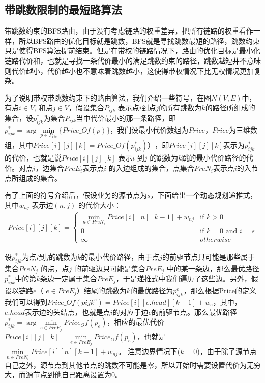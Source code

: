 \subsection{带跳数限制的最短路算法}
带跳数约束的BFS路由，由于没有考虑链路的权重差异，把所有链路的权重看作一样，所以BFS路由的优化目标就是跳数，BFS就是寻找跳数最短的路径，跳数约束只是使得BFS算法提前结束。但是在带权的链路情况下，路由的优化目标是最小化链路代价和，也就是寻找一条代价最小的满足跳数约束的路径，跳数越短并不意味则代价越小，代价越小也不意味着跳数越小，这使得带权情况下比无权情况更加复杂。

为了说明带权带跳数约束下的路由算法，我们介绍一些符号，在图$N(V,E)$中，有点$i \in V$, 和点$j \in V$，假设集合$P_{ijk}$ 表示点$i$到点$j$的所有跳数为$k$的路径所组成的集合，设$p_{ijk}^*$为集合$P_{ijk}$当中代价最小的那一条路径，即$p_{ijk}^* =\arg\min\limits_{p \in P_{ijk}}\{Price\_Of(p)\}$，我们设最小代价数组为$Price$，$Price$为三维数组，其中$Price[i][j][k]=Price\_Of(p_{ijk}^*) ）$，即$Price[i][j][k]$表示为$p_{ijk}^*$ 的代价，也就是说$Price[i][j][k]$ 表示$i$ 到$j$ 的跳数为$k$跳的最小代价路径的代价。对点$i$，边集合$PreE_i$表示点$i$ 的入边组成的集合，点集合$PreN_i$表示点$i$的入节点所组成的集合。

有了上面的符号介绍后，假设业务的源节点为$s$，下面给出一个动态规划递推式，其中$w_{nj}$ 表示边$(n,j)$ 的代价大小：
\begin{equation}\label{dynamic}
\begin{split}
Price[i][j][k]
=\begin{cases}
\min\limits_{n \in PreN_i}{Price[i][n][k-1]+w_{nj}} & \text{if $k>0$}\\
0 & \text{if $k=0$ and $i=s $} \\
\infty &{otherwise}
\end{cases}
\end{split}
\end{equation}

设$p_{ijk}^*$为点$i$到$j$的跳数为$k$的最小代价路径，由于点$j$的前驱节点只可能是那些属于集合$PreN_j$ 的点，点$j$ 的前驱边只可能是集合$PreE_j$ 中的某一条边，那么最优路径$p_{ijk}^*$中的第$k$条边一定属于集合$PreE_j$，于是递推式中我们遍历了这些边。另外，假设以链路$e$（ $e \in PreE_j$）结尾的跳数为$k$的最优路径为$p_{ijk}^e$，那么根据Price的定义我们可以得到$Price\_Of(p{ijk}^e)=Price[i][e.head][k-1]+w_e$，其中，$e.head$表示边的头结点，也就是点$i$的对应于边$e$的前驱节点。那么最优路径$p_{ijk}^*=\arg\min\limits_{e \in PreE_j}{Price_Of(p_e)}$，相应的最优代价$Price[i][j][k]=\min\limits_{e \in PreE_j}{Price_Of(p_e)}$，也就是$\min\limits_{n \in PreN_i}{Price[i][n][k-1]+w_{nj}}$。 注意边界情况下($k=0$)，由于除了源节点自己之外，源节点到其他节点的跳数不可能是零，所以开始时需要设置代价为无穷大，而源节点到他自己距离设置为0。

